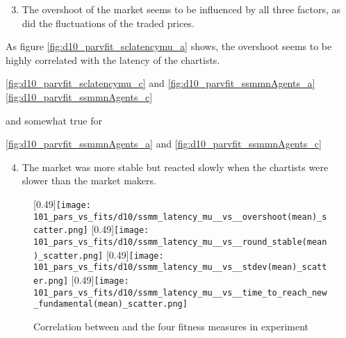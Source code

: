 \begin{enumerate}
\setcounter{enumi}{2}
\item The overshoot of the market seems to be influenced by all three factors, as did the fluctuations of the traded prices.
\end{enumerate}
As figure \ref{fig:d10_parvfit_sclatencymu_a} shows, the overshoot seems to be highly correlated with the latency of the chartists.


\ref{fig:d10_parvfit_sclatencymu_c} and \ref{fig:d10_parvfit_ssmmnAgents_a} \ref{fig:d10_parvfit_ssmmnAgents_c}

and somewhat true for

\ref{fig:d10_parvfit_ssmmnAgents_a} and \ref{fig:d10_parvfit_ssmmnAgents_c}

\begin{enumerate}
\setcounter{enumi}{3}
\item The market was more stable but reacted slowly when the chartists were slower than the market makers.
\end{enumerate}



\begin{figure}
	\centering
	[0.49\linewidth]{\texttt{[image: 101\_pars\_vs\_fits/d10/ssmm\_latency\_mu\_\_vs\_\_overshoot(mean)\_scatter.png]}}
	[0.49\linewidth]{\texttt{[image: 101\_pars\_vs\_fits/d10/ssmm\_latency\_mu\_\_vs\_\_round\_stable(mean)\_scatter.png]}}
	[0.49\linewidth]{\texttt{[image: 101\_pars\_vs\_fits/d10/ssmm\_latency\_mu\_\_vs\_\_stdev(mean)\_scatter.png]}}
	[0.49\linewidth]{\texttt{[image: 101\_pars\_vs\_fits/d10/ssmm\_latency\_mu\_\_vs\_\_time\_to\_reach\_new\_fundamental(mean)\_scatter.png]}}
	\caption{Correlation between \sclatencymu and the four fitness measures in experiment \dten}
	\label{fig:d10_parvfit_ssmmlatencymu}
\end{figure}


